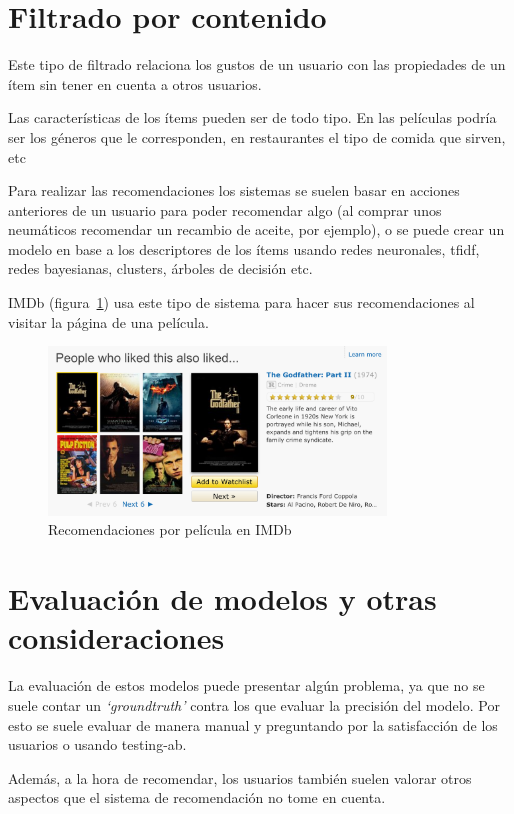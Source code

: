 \documentclass[withindex, glossary]{cam-thesis}
\begin{document}
\section{Filtrado por contenido}
Este tipo de filtrado relaciona los gustos de un usuario con las propiedades de un ítem sin tener en cuenta a otros usuarios.

Las características de los ítems pueden ser de todo tipo. En las películas podría ser los géneros que le corresponden, en restaurantes el tipo de comida que sirven, etc

Para realizar las recomendaciones los sistemas se suelen basar en acciones anteriores de un usuario para poder recomendar algo (al comprar unos neumáticos recomendar un recambio de aceite, por ejemplo), o se puede crear un modelo en base a los descriptores de los ítems usando redes neuronales, \acrshort{tfidf}, redes bayesianas, clusters, árboles de decisión etc.

IMDb (figura~\ref{rec-imdb}) usa este tipo de sistema para hacer sus recomendaciones al visitar la página de una película.
\begin{figure}[!htbp]
    \centering
    \includegraphics[width=0.8\textwidth]{./figures/rec-imdb.png}
    \caption{Recomendaciones por película en IMDb}\label{rec-imdb}
\end{figure}

\section{Evaluación de modelos y otras consideraciones}
La evaluación de estos modelos puede presentar algún problema, ya que no se suele contar un \textit{`\gls{groundtruth}'} contra los que evaluar la precisión del modelo. Por esto se suele evaluar de manera manual y preguntando por la satisfacción de los usuarios o usando \gls{testing-ab}\cite{Beel:2013:CAO:2532508.2532511}.

Además, a la hora de recomendar, los usuarios también suelen valorar otros aspectos que el sistema de recomendación no tome en cuenta.
\end{document}
